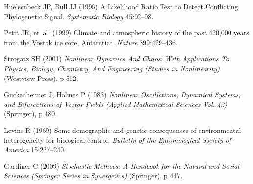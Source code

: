 \documentclass{pnastwo}
\begin{document}
\begin{article}
\begin{thebibliography}{10}
Huelsenbeck JP, Bull JJ
\newblock (1996) {A Likelihood Ratio Test to Detect Conflicting Phylogenetic
  Signal}.
\newblock \emph{Systematic Biology} 45:92--98.

Petit JR, {et~al.}
\newblock (1999) {Climate and atmospheric history of the past 420,000 years
  from the Vostok ice core, Antarctica}.
\newblock \emph{Nature} 399:429--436.

Strogatz SH
\newblock (2001) \emph{{Nonlinear Dynamics And Chaos: With Applications To
  Physics, Biology, Chemistry, And Engineering (Studies in Nonlinearity)}}
\newblock (Westview Press), p 512.

Guckenheimer J, Holmes P
\newblock (1983) \emph{{Nonlinear Oscillations, Dynamical Systems, and
  Bifurcations of Vector Fields (Applied Mathematical Sciences Vol. 42)}}
\newblock (Springer), p 480.

Levins R
\newblock (1969) {Some demographic and genetic consequences of environmental
  heterogeneity for biological control}.
\newblock \emph{Bulletin of the Entomological Society of America} 15:237--240.

Gardiner C
\newblock (2009) \emph{{Stochastic Methods: A Handbook for the Natural and
  Social Sciences (Springer Series in Synergetics)}}
\newblock (Springer), p 447.

\end{thebibliography}
                           \end{article}


\end{document}
